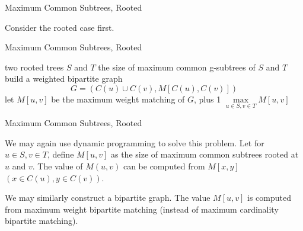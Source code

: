 \documentclass{beamer}
\begin{document}
\begin{frame}{Maximum Common Subtrees, Rooted}
\begin{figure}
\end{figure}

Consider the rooted case first.
\end{frame}

\begin{frame}{Maximum Common Subtrees, Rooted}
\begin{algorithm}[H] 
	\caption{Rooted Maximum Common Subtrees} 
	\begin{algorithmic}[1] 
		\Require two rooted trees $S$ and $T$
		\Ensure the size of maximum common g-subtrees of $S$ and $T$
		\State build a weighted bipartite graph 
		$$G = (C(u) \cup C(v), M[C(u), C(v)])$$
		\State let $M[u, v]$ be the maximum weight matching of $G$, plus 1
		\EndFor
		\EndFor
		\State \Return $\max\limits_{u \in S, v \in T} M[u, v]$
	\end{algorithmic} 
\end{algorithm}
\end{frame}

\begin{frame}{Maximum Common Subtrees, Rooted}
\begin{solution}
	We may again use dynamic programming to solve this problem. Let for $u \in S, v \in T$, define $M[u, v]$ as the size of maximum common subtrees rooted at $u$ and $v$. The value of $M(u, v)$ can be computed from $M[x, y]$ $(x \in C(u), y \in C(v))$.
\end{solution}

We may similarly construct a bipartite graph. The value $M[u, v]$ is computed from maximum weight bipartite matching (instead of maximum cardinality bipartite matching).

\end{frame}
\end{document}
